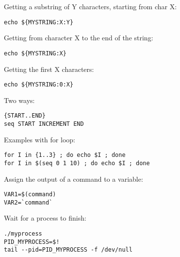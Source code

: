 \documentclass[twocolumn,8pt]{article}
\begin{document}

\begin{mdframed}[frametitle=Substrings]
Getting a substring of Y characters, starting from char X:
\begin{lstlisting}
echo ${MYSTRING:X:Y}
\end{lstlisting}

Getting from character X to the end of the string:
\begin{lstlisting}
echo ${MYSTRING:X}
\end{lstlisting}

Getting the first X characters:
\begin{lstlisting}
echo ${MYSTRING:0:X}
\end{lstlisting}

\end{mdframed}


\begin{mdframed}[frametitle=Ranges]
Two ways:
\begin{lstlisting}
{START..END}
seq START INCREMENT END
\end{lstlisting}

Examples with for loop:
\begin{lstlisting}
for I in {1..3} ; do echo $I ; done
for I in $(seq 0 1 10) ; do echo $I ; done
\end{lstlisting}
\end{mdframed}



\begin{mdframed}[frametitle=Subshell]
Assign the output of a command to a variable:
\begin{lstlisting}
VAR1=$(command)
VAR2=`command`
\end{lstlisting}
\end{mdframed}



\begin{mdframed}[frametitle=Wait]
Wait for a process to finish:
\begin{lstlisting}
./myprocess
PID_MYPROCESS=$!
tail --pid=PID_MYPROCESS -f /dev/null
\end{lstlisting}
\end{mdframed}
\end{document}
